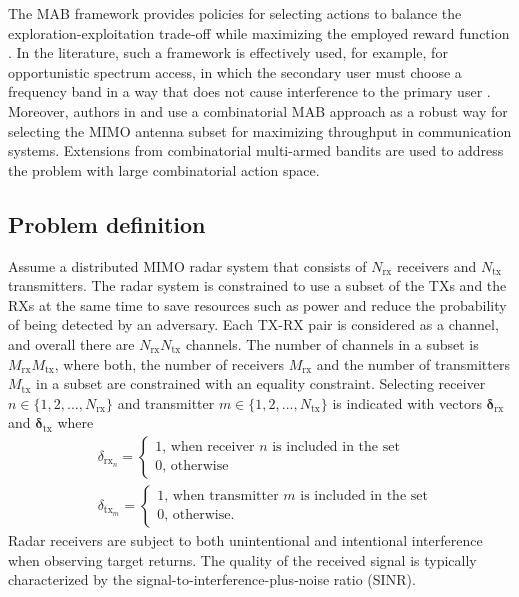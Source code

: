 \documentclass[english, 12pt, a4paper, elec, utf8, a-1b, online]{aaltothesis}
\newcommand{\easvtx}{\delta_{\text{tx}_m}}
\newcommand{\vasvtx}{\boldsymbol{\delta}_{\text{tx}}}
\newcommand{\easvrx}{\delta_{\text{rx}_n}}
\newcommand{\vasvrx}{\boldsymbol{\delta}_{\text{rx}}}
\begin{document}
The MAB framework provides policies for selecting actions to balance the exploration-exploitation trade-off while maximizing the employed reward function \cite{Lattimore2019}.
In the literature, such a framework is effectively used, for example, for opportunistic spectrum access, in which the secondary user must choose a frequency band in a way that does not cause interference to the primary user \cite{Zhao2008}.
Moreover, authors in \cite{Mukherjee2012} and \cite{Kuai2019} use a combinatorial MAB approach as a robust way for selecting the MIMO antenna subset for maximizing throughput in communication systems.
Extensions from combinatorial multi-armed bandits are used to address the problem with large combinatorial action space.

\subsection{Problem definition}

\newcommand{\ntx}{{N_{\text{tx}}}}
\newcommand{\nrx}{{N_{\text{rx}}}}
\newcommand{\srx}{{M_{\text{rx}}}}
\newcommand{\stx}{{M_{\text{tx}}}}


Assume a distributed MIMO radar system that consists of $\nrx$ receivers and $\ntx$ transmitters.
The radar system is constrained to use a subset of the TXs and the RXs at the same time to save resources such as power and reduce the probability of being detected by an adversary.
Each TX-RX pair is considered as a channel, and overall there are $\nrx\ntx$ channels.
The number of channels in a subset is $\srx \stx$, where both, the number of receivers $\srx$ and the number of transmitters $\stx$ in a subset are constrained with an equality constraint.
Selecting receiver $n \in \{1, 2, ..., \nrx\}$ and transmitter $m \in \{1,2, ..., \ntx\}$ is indicated with vectors $\vasvrx$ and $\vasvtx$ where
\begin{align}
    &\easvrx = 
    \left\{\begin{array}{l}
        1 \text{, when receiver $n$ is included in the set} \\
        0 \text{, otherwise}
    \end{array}\right.\\
    &\easvtx = 
    \left\{\begin{array}{l}
        1 \text{, when transmitter $m$ is included in the set} \\
        0 \text{, otherwise.}
    \end{array}\right.
\end{align}
Radar receivers are subject to both unintentional and intentional interference when observing target returns.
The quality of the received signal is typically characterized by the signal-to-interference-plus-noise ratio (SINR).
\end{document}
